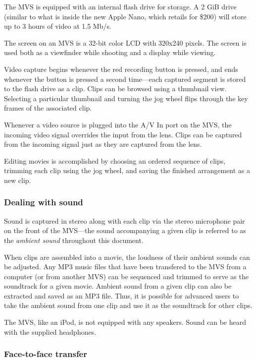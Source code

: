 \documentclass[12pt]{article}
\begin{document}
The MVS is equipped with an internal flash drive for storage.
A 2 GiB drive (similar to what is inside the new Apple Nano, which retails for \$200) will store up to 3 hours of video at 1.5 Mb/s.

The screen on an MVS is a 32-bit color LCD with 320x240 pixels.
The screen is used both as a viewfinder while shooting and a display while viewing.

Video capture begins whenever the red recording button is pressed, and ends whenever the button is pressed a second time---each captured segment is stored to the flash drive as a clip.
Clips can be browsed using a thumbnail view.
Selecting a particular thumbnail and turning the jog wheel flips through the key frames of the associated clip.

Whenever a video source is plugged into the A/V In port on the MVS, the incoming video signal overrides the input from the lens.
Clips can be captured from the incoming signal just as they are captured from the lens.

Editing movies is accomplished by choosing an ordered sequence of clips, trimming each clip using the jog wheel, and saving the finished arrangement as a new clip.

\subsubsection{Dealing with sound}
Sound is captured in stereo along with each clip via the stereo microphone pair on the front of the MVS---the sound accompanying a given clip is referred to as the {\it ambient sound} throughout this document.

When clips are assembled into a movie, the loudness of their ambient sounds can be adjusted.
Any MP3 music files that have been transfered to the MVS from a computer (or from another MVS) can be sequenced and trimmed to serve as the soundtrack for a given movie.
Ambient sound from a given clip can also be extracted and saved as an MP3 file.
Thus, it is possible for advanced users to take the ambient sound from one clip and use it as the soundtrack for other clips.

The MVS, like an iPod, is not equipped with any speakers.
Sound can be heard with the supplied headphones.


\subsubsection{Face-to-face transfer}
\end{document}
